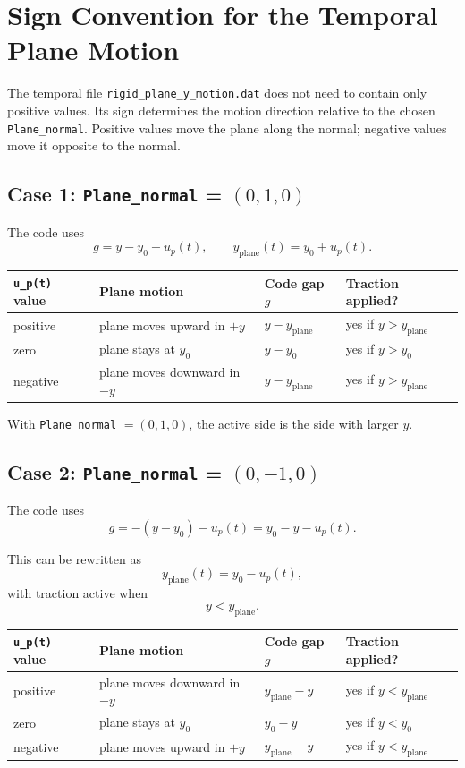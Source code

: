 \documentclass[11pt]{article}
\begin{document}
\section{Sign Convention for the Temporal Plane Motion}

The temporal file \texttt{rigid\_plane\_y\_motion.dat} does not need to contain
only positive values. Its sign determines the motion direction relative to the
chosen \texttt{Plane\_normal}. Positive values move the plane along the normal;
negative values move it opposite to the normal.

\subsection*{Case 1: \texttt{Plane\_normal} = \texorpdfstring{$(0,1,0)$}{(0,1,0)}}

The code uses
\[
g = y - y_0 - u_p(t),
\qquad
y_{\text{plane}}(t) = y_0 + u_p(t).
\]

\begin{center}
\begin{tabular}{|l|l|l|l|}
\hline
\texttt{u\_p(t)} value & Plane motion & Code gap \(g\) & Traction applied? \\
\hline
positive & plane moves upward in \(+y\) & \(y - y_{\text{plane}}\) & yes if \(y > y_{\text{plane}}\) \\
\hline
zero & plane stays at \(y_0\) & \(y - y_0\) & yes if \(y > y_0\) \\
\hline
negative & plane moves downward in \(-y\) & \(y - y_{\text{plane}}\) & yes if \(y > y_{\text{plane}}\) \\
\hline
\end{tabular}
\end{center}

With \texttt{Plane\_normal} \(= (0,1,0)\), the active side is the side with
larger \(y\).

\subsection*{Case 2: \texttt{Plane\_normal} = \texorpdfstring{$(0,-1,0)$}{(0,-1,0)}}

The code uses
\[
g = -(y - y_0) - u_p(t) = y_0 - y - u_p(t).
\]

This can be rewritten as
\[
y_{\text{plane}}(t) = y_0 - u_p(t),
\]
with traction active when
\[
y < y_{\text{plane}}.
\]

\begin{center}
\begin{tabular}{|l|l|l|l|}
\hline
\texttt{u\_p(t)} value & Plane motion & Code gap \(g\) & Traction applied? \\
\hline
positive & plane moves downward in \(-y\) & \(y_{\text{plane}} - y\) & yes if \(y < y_{\text{plane}}\) \\
\hline
zero & plane stays at \(y_0\) & \(y_0 - y\) & yes if \(y < y_0\) \\
\hline
negative & plane moves upward in \(+y\) & \(y_{\text{plane}} - y\) & yes if \(y < y_{\text{plane}}\) \\
\hline
\end{tabular}
\end{center}
\end{document}
